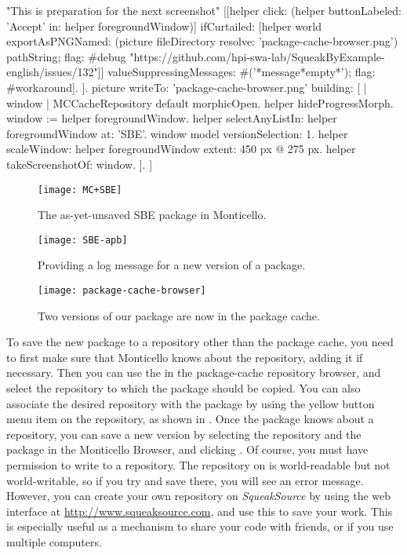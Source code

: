 \documentclass[a4paper,10pt,twoside]{book}
\begin{document}
\begin{ExecuteSmalltalkScript}
				"This is preparation for the next screenshot"
					[[helper click: (helper buttonLabeled: 'Accept' in: helper foregroundWindow)]
							ifCurtailed: [helper world exportAsPNGNamed: (picture fileDirectory resolve: 'package-cache-browser.png') pathString; flag: #debug "https://github.com/hpi-swa-lab/SqueakByExample-english/issues/132"]]
						valueSuppressingMessages: #('*message*empty*');
						flag: #workaround].
	].
	picture writeTo: 'package-cache-browser.png' building: [
		| window |
		MCCacheRepository default morphicOpen.
		helper hideProgressMorph.
		window := helper foregroundWindow.
		helper selectAnyListIn: helper foregroundWindow at: 'SBE'.
		window model versionSelection: 1.
		helper scaleWindow: helper foregroundWindow extent: 450 px @ 275 px.
		helper takeScreenshotOf: window.
	].
]
\end{ExecuteSmalltalkScript}
\begin{figure}[tbp]
	\begin{center}
		\texttt{[image: MC+SBE]}
	\end{center}
	\caption{The as-yet-unsaved SBE package in Monticello.}
	\label{fig:MC+SBE}
\end{figure}

\begin{figure}[tbp]
	\begin{center}
		\texttt{[image: SBE-apb]}
	\end{center}
	\caption{Providing a log message for a new version of a package.}
	\label{fig:SBE-apb}
\end{figure}

\begin{figure}[tbp]
	\begin{center}
	\texttt{[image: package-cache-browser]}
	\end{center}
	\caption{Two versions of our package are now in the package cache.}
	\label{fig:package-cache-browser}
\end{figure}

To save the new package to a repository other than the package cache, you need to first make sure that Monticello knows about the repository, adding it if necessary.
Then you can use the  in the package-cache repository browser, and select the repository to which the package should be copied.
You can also associate the desired repository with the package by using the yellow button menu item  on the repository, as shown in .
Once the package knows about a repository, you can save a new version by selecting the repository and the package in the Monticello Browser, and clicking .
Of course, you must have permission to write to a repository.
The  repository on  is world-readable but not world-writable, so if you try and save there, you will see an error message.
However, you can create your own repository on \emph{SqueakSource} by using the web interface at \url{http://www.squeaksource.com}, and use this to save your work.
This is especially useful as a mechanism to share your code with friends, or if you use multiple computers.
\end{document}
